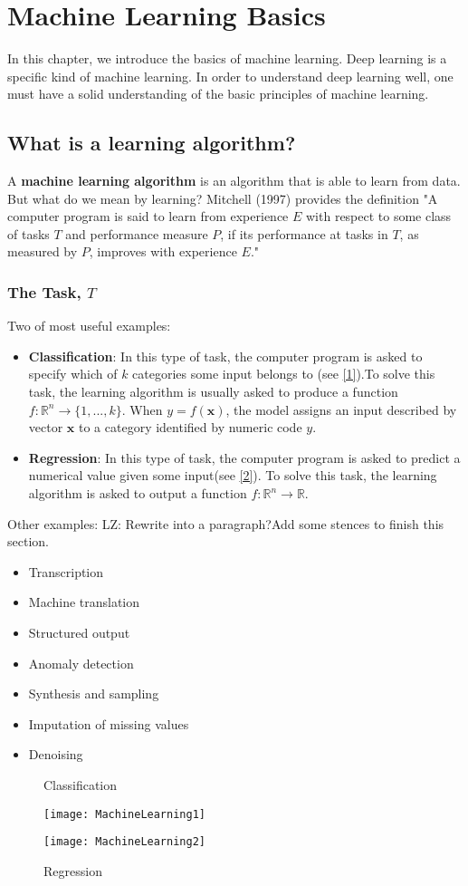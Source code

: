 \chapter{Machine Learning Basics}
In this chapter, we introduce the basics of machine learning. {Deep learning} is a specific kind of machine learning. In order to understand deep learning well, one must have a solid understanding of the basic principles of machine learning.
\section{What is a learning algorithm?}
   	A \textbf{machine learning algorithm} is an algorithm that is able to learn from data. But	what do we mean by learning? Mitchell (1997) provides the definition "A computer program is said to learn from experience $E$	with respect to some class of tasks	$T$	and performance measure	$P$, if its performance at tasks in	$T$, as measured by $P$, improves with experience $E$."

\subsection{The Task, $T$}
Two of most useful examples:
\begin{itemize}
\item \textbf{Classification}: In this type of task, the computer program is asked to specify which of $k$ categories some input belongs to (see \eqref{1}).To solve this task, the learning algorithm is usually asked to produce a function $f:\mathbb R^n \rightarrow \{1,...,k\}$. When $y=f(\bm x)$, the model assigns an input described by vector $\bm x$ to a category identified by numeric code $y$.
\item \textbf{Regression}: In this type of task, the computer program is asked to predict a numerical value given some input(see \eqref{2}). To solve this task, the learning algorithm is asked to output a function $f:\mathbb R^n \rightarrow \mathbb R$.
\end{itemize}
Other examples: {\color{red} LZ: Rewrite into a paragraph?Add some stences to finish this section.}
\begin{itemize}
    \item Transcription
    \item Machine translation
    \item Structured output
    \item Anomaly detection
    \item Synthesis and sampling
    \item Imputation of missing values
    \item Denoising
\end{itemize}
    \begin{figure}
        \caption{Classification}
        \texttt{[image: MachineLearning1]}\label{1}
        \caption{Regression}
        \texttt{[image: MachineLearning2]}\label{2}
    \end{figure}

